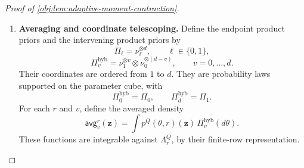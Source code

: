 \documentclass[11pt]{article}
\begin{document}
\begin{proof}[Proof of \cref{obj:lem:adaptive-moment-contraction}]
\begin{enumerate}
Define its Taylor polynomial by
\[
\mathsf{taylor}^{\theta,r}_{j,k}(u)
=
\sum_{q=0}^{k-1}
 \frac{\left(\mathsf{poly}^{\theta,r}_j\right)^{(q)}(0)}{q!}\,u^q,
\qquad u\in\mathbb R.
\]
At \(u=0\), the remainder equals zero. For \(u\ne0\), Taylor's theorem with Lagrange remainder on the segment joining \(0\) and \(u\) gives
\[
\begin{split}
\left|
 \mathsf{poly}^{\theta,r}_j(u)
 -\mathsf{taylor}^{\theta,r}_{j,k}(u)
\right|
&\le
\frac{|u|^k}{k!}
\sup_{u_*\in[\min\{0,u\},\,\max\{0,u\}]}
 \left|
 \left(\mathsf{poly}^{\theta,r}_j\right)^{(k)}(u_*)
 \right|\\
&\le |u|^k\sqrt{\binom nk}\,\beta^k
\qquad(|u|\le\alpha).
\end{split}
\]
Matching moments cancel its Taylor polynomial:
\[
\int\mathsf{taylor}^{\theta,r}_{j,k}(u)\,\nu_0(du)
=
\int\mathsf{taylor}^{\theta,r}_{j,k}(u)\,\nu_1(du).
\]
Each prior is supported on \([-\alpha,\alpha]\) and has mass one, so
\[
\left|
\int
 \left(\mathsf{poly}^{\theta,r}_j(u)
       -\mathsf{taylor}^{\theta,r}_{j,k}(u)\right)\nu_\ell(du)
\right|
\le\alpha^k\sqrt{\binom nk}\,\beta^k,
\qquad \ell\in\{0,1\}.
\]
Finally, exchanging the integrals in the scalar polynomial gives
\[
\begin{split}
\int|\mathsf{diff}^{\theta,r}_j(\mathbf z)|\,\Lambda_r^Q(d\mathbf z)
&=
\int\mathsf{poly}^{\theta,r}_j(u)\,\nu_0(du)
-\int\mathsf{poly}^{\theta,r}_j(u)\,\nu_1(du)\\
&\le 2\alpha^k\sqrt{\binom nk}\,\beta^k.
\end{split}
\]
This is uniform in the remaining coordinates, the seed, and the coordinate being replaced.

\item \textbf{Averaging and coordinate telescoping.}
Define the endpoint product priors and the intervening product priors by
\[
\Pi_\ell=\nu_\ell^{\otimes d},
\qquad \ell\in\{0,1\},
\]
\[
\Pi_v^{\mathrm{hyb}}
=\nu_1^{\otimes v}\otimes\nu_0^{\otimes(d-v)},
\qquad v=0,\ldots,d.
\]
Their coordinates are ordered from \(1\) to \(d\). They are probability laws supported on the parameter cube, with
\[
\Pi_0^{\mathrm{hyb}}=\Pi_0,
\qquad
\Pi_d^{\mathrm{hyb}}=\Pi_1.
\]
For each \(r\) and \(v\), define the averaged density
\[
\mathsf{avg}_v^r(\mathbf z)
=\int p^Q(\theta,r)(\mathbf z)\,\Pi_v^{\mathrm{hyb}}(d\theta).
\]
These functions are integrable against \(\Lambda_r^Q\), by their finite-row representation.


\end{enumerate}
\end{proof}
\end{document}
